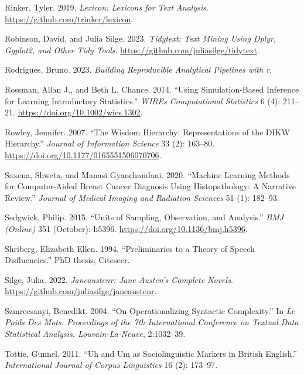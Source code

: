 \documentclass[
  letterpaper,
  DIV=11,
  numbers=noendperiod]{scrreprt}
\newlength{\cslhangindent}
\newenvironment{CSLReferences}[2] %
 {\begin{list}{}{%
  \setlength{\itemindent}{0pt}
  \setlength{\leftmargin}{0pt}
  \setlength{\parsep}{0pt}
  \ifodd #1
   \setlength{\leftmargin}{\cslhangindent}
   \setlength{\itemindent}{-1\cslhangindent}
  \fi
  \setlength{\itemsep}{#2\baselineskip}}}
 {\end{list}}
\theoremstyle{definition}
\theoremstyle{remark}
\begin{document}
\begin{CSLReferences}{1}{0}
Rinker, Tyler. 2019. \emph{Lexicon: Lexicons for Text Analysis}.
\url{https://github.com/trinker/lexicon}.

Robinson, David, and Julia Silge. 2023. \emph{Tidytext: Text Mining
Using Dplyr, Ggplot2, and Other Tidy Tools}.
\url{https://github.com/juliasilge/tidytext}.

Rodrigues, Bruno. 2023. \emph{Building Reproducible Analytical Pipelines
with r}.

Rossman, Allan J., and Beth L. Chance. 2014. {``Using Simulation-Based
Inference for Learning Introductory Statistics.''} \emph{WIREs
Computational Statistics} 6 (4): 211--21.
\url{https://doi.org/10.1002/wics.1302}.

Rowley, Jennifer. 2007. {``The Wisdom Hierarchy: Representations of the
DIKW Hierarchy.''} \emph{Journal of Information Science} 33 (2):
163--80. \url{https://doi.org/10.1177/0165551506070706}.

Saxena, Shweta, and Manasi Gyanchandani. 2020. {``Machine Learning
Methods for Computer-Aided Breast Cancer Diagnosis Using Histopathology:
A Narrative Review.''} \emph{Journal of Medical Imaging and Radiation
Sciences} 51 (1): 182--93.

Sedgwick, Philip. 2015. {``Units of Sampling, Observation, and
Analysis.''} \emph{BMJ (Online)} 351 (October): h5396.
\url{https://doi.org/10.1136/bmj.h5396}.

Shriberg, Elizabeth Ellen. 1994. {``Preliminaries to a Theory of Speech
Disfluencies.''} PhD thesis, Citeseer.

Silge, Julia. 2022. \emph{Janeaustenr: Jane Austen's Complete Novels}.
\url{https://github.com/juliasilge/janeaustenr}.

Szmrecsanyi, Benedikt. 2004. {``On Operationalizing Syntactic
Complexity.''} In \emph{Le Poids Des Mots. Proceedings of the 7th
International Conference on Textual Data Statistical Analysis.
Louvain-La-Neuve}, 2:1032--39.

Tottie, Gunnel. 2011. {``Uh and Um as Sociolinguistic Markers in British
English.''} \emph{International Journal of Corpus Linguistics} 16 (2):
173--97.


\end{CSLReferences}
\end{document}
